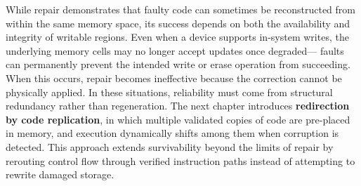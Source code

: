 While repair demonstrates that faulty code can sometimes be reconstructed from within the same memory space, 
its success depends on both the availability and integrity of writable regions. 
Even when a device supports in-system writes, the underlying memory cells may no longer accept updates once degraded—%
faults can permanently prevent the intended write or erase operation from succeeding. 
When this occurs, repair becomes ineffective because the correction cannot be physically applied.  
In these situations, reliability must come from structural redundancy rather than regeneration.  
The next chapter introduces \textbf{redirection by code replication}, in which multiple validated copies of code are pre-placed in memory, 
and execution dynamically shifts among them when corruption is detected.  
This approach extends survivability beyond the limits of repair by rerouting control flow through verified instruction paths 
instead of attempting to rewrite damaged storage.